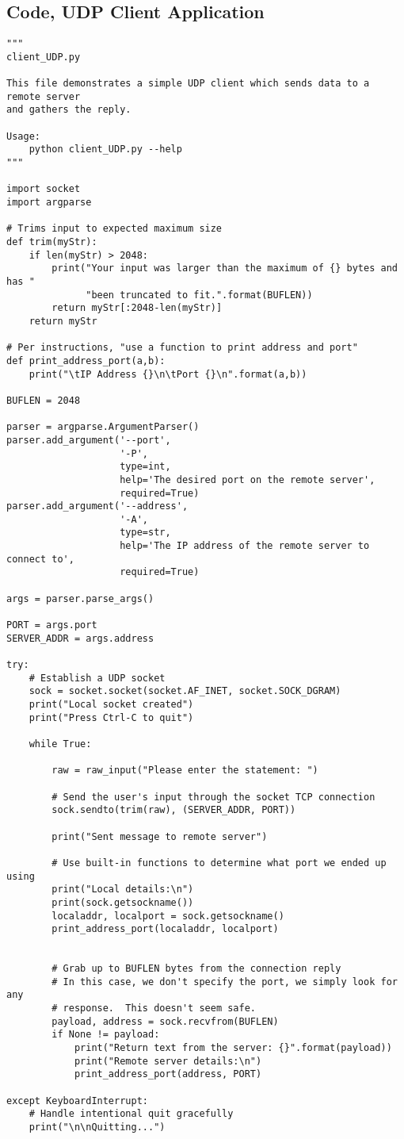 \documentclass{article}
\begin{document}
\subsection*{Code, UDP Client Application}
\begin{verbatim}
"""
client_UDP.py

This file demonstrates a simple UDP client which sends data to a remote server
and gathers the reply.

Usage:
    python client_UDP.py --help
"""

import socket
import argparse

# Trims input to expected maximum size
def trim(myStr):
    if len(myStr) > 2048:
        print("Your input was larger than the maximum of {} bytes and has "
              "been truncated to fit.".format(BUFLEN))
        return myStr[:2048-len(myStr)]
    return myStr

# Per instructions, "use a function to print address and port"
def print_address_port(a,b):
    print("\tIP Address {}\n\tPort {}\n".format(a,b))

BUFLEN = 2048

parser = argparse.ArgumentParser()
parser.add_argument('--port',
                    '-P',
                    type=int,
                    help='The desired port on the remote server',
                    required=True)
parser.add_argument('--address',
                    '-A',
                    type=str,
                    help='The IP address of the remote server to connect to',
                    required=True)

args = parser.parse_args()

PORT = args.port
SERVER_ADDR = args.address

try:
    # Establish a UDP socket
    sock = socket.socket(socket.AF_INET, socket.SOCK_DGRAM)
    print("Local socket created")
    print("Press Ctrl-C to quit")

    while True:
        
        raw = raw_input("Please enter the statement: ")

        # Send the user's input through the socket TCP connection
        sock.sendto(trim(raw), (SERVER_ADDR, PORT))

        print("Sent message to remote server")

        # Use built-in functions to determine what port we ended up using
        print("Local details:\n")
        print(sock.getsockname())
        localaddr, localport = sock.getsockname()
        print_address_port(localaddr, localport)

        
        # Grab up to BUFLEN bytes from the connection reply
        # In this case, we don't specify the port, we simply look for any
        # response.  This doesn't seem safe.
        payload, address = sock.recvfrom(BUFLEN)
        if None != payload:
            print("Return text from the server: {}".format(payload))
            print("Remote server details:\n")
            print_address_port(address, PORT)

except KeyboardInterrupt:
    # Handle intentional quit gracefully
    print("\n\nQuitting...")
\end{verbatim}
\end{document}
